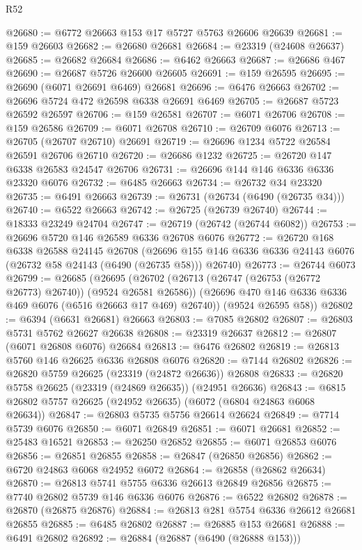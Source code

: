 \begin{lexlean}{R52}
\begin{coremodule}
@26680 := @6772 @26663 @153 @17 @5727 @5763 @26606 @26639
@26681 := @159 @26603
@26682 := @26680 @26681
@26684 := @23319 (@24608 @26637)
@26685 := @26682 @26684
@26686 := @6462 @26663
@26687 := @26686 @467
@26690 := @26687 @5726 @26600 @26605
@26691 := @159 @26595
@26695 := @26690 (@6071 @26691 @6469) @26681
@26696 := @6476 @26663
@26702 := @26696 @5724 @472 @26598 @6338 @26691 @6469
@26705 := @26687 @5723 @26592 @26597
@26706 := @159 @26581
@26707 := @6071 @26706
@26708 := @159 @26586
@26709 := @6071 @26708
@26710 := @26709 @6076
@26713 := @26705 (@26707 @26710) @26691
@26719 := @26696 @1234 @5722 @26584 @26591 @26706 @26710
@26720 := @26686 @1232
@26725 := @26720 @147 @6338 @26583 @24547 @26706
@26731 := @26696 @144 @146 @6336 @6336 @23320 @6076
@26732 := @6485 @26663
@26734 := @26732 @34 @23320
@26735 := @6491 @26663
@26739 := @26731 (@26734 (@6490 (@26735 @34)))
@26740 := @6522 @26663
@26742 := @26725 (@26739 @26740)
@26744 := @18333 @23249 @24704
@26747 := @26719 (@26742 (@26744 @6082))
@26753 := @26696 @5720 @146 @26589 @6336 @26708 @6076
@26772 := @26720
    @168
    @6338
    @26588
    @24145
    @26708
    (@26696 @155 @146 @6336 @6336 @24143 @6076 (@26732 @58 @24143 (@6490 (@26735 @58))) @26740)
@26773 := @26744 @6073
@26799 := @26685
    (@26695
      (@26702
        (@26713 (@26747 (@26753 (@26772 @26773) @26740)) (@9524 @26581 @26586))
        (@26696 @470 @146 @6336 @6336 @469 @6076 (@6516 @26663 @17 @469) @26740))
      (@9524 @26595 @58))
@26802 := @6394 (@6631 @26681) @26663
@26803 := @7085 @26802
@26807 := @26803 @5731 @5762 @26627 @26638
@26808 := @23319 @26637
@26812 := @26807 (@6071 @26808 @6076) @26684
@26813 := @6476 @26802
@26819 := @26813 @5760 @146 @26625 @6336 @26808 @6076
@26820 := @7144 @26802
@26826 := @26820 @5759 @26625 (@23319 (@24872 @26636)) @26808
@26833 := @26820 @5758 @26625 (@23319 (@24869 @26635)) (@24951 @26636)
@26843 := @6815 @26802 @5757 @26625 (@24952 @26635) (@6072 (@6804 @24863 @6068 @26634))
@26847 := @26803 @5735 @5756 @26614 @26624
@26849 := @7714 @5739 @6076
@26850 := @6071 @26849
@26851 := @6071 @26681
@26852 := @25483 @16521
@26853 := @26250 @26852
@26855 := @6071 @26853 @6076
@26856 := @26851 @26855
@26858 := @26847 (@26850 @26856)
@26862 := @6720 @24863 @6068 @24952 @6072
@26864 := @26858 (@26862 @26634)
@26870 := @26813 @5741 @5755 @6336 @26613 @26849 @26856
@26875 := @7740 @26802 @5739 @146 @6336 @6076
@26876 := @6522 @26802
@26878 := @26870 (@26875 @26876)
@26884 := @26813 @281 @5754 @6336 @26612 @26681 @26855
@26885 := @6485 @26802
@26887 := @26885 @153 @26681
@26888 := @6491 @26802
@26892 := @26884 (@26887 (@6490 (@26888 @153)))

\end{coremodule}
\end{lexlean}
